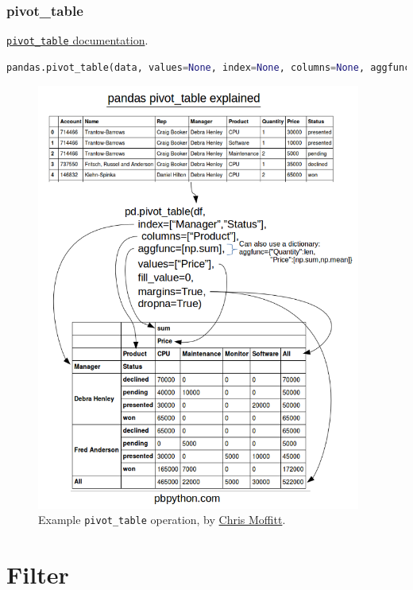\subsubsection{pivot\_table}
\label{pandas:pivoting:pivot_table}

\noindent \href{https://pandas.pydata.org/pandas-docs/stable/reference/api/pandas.pivot_table.html}{\texttt{pivot\_table} documentation}.

\begin{lstlisting}[language=Python]
pandas.pivot_table(data, values=None, index=None, columns=None, aggfunc='mean', fill_value=None, margins=False, dropna=True, margins_name='All')
\end{lstlisting}

\begin{figure}[H]
\centering
\includegraphics[width=0.95\textwidth]{figures/pandas/pivot-table-datasheet.png}
\caption{
Example \pandas \texttt{pivot\_table} operation, by \href{http://pbpython.com/pandas-pivot-table-explained.html}{Chris Moffitt}.
}
\label{fig:pandas:pivot_table}
\end{figure}

\section{Filter}
\label{pandas:filter}

